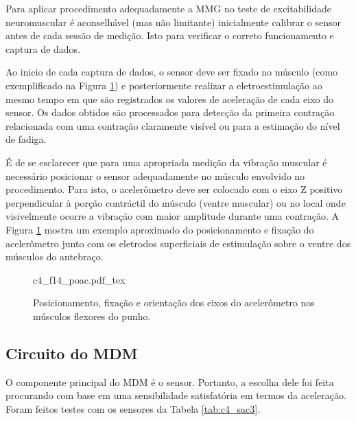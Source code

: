 Para aplicar procedimento adequadamente a \acrshort{MMG} no teste de excitabilidade neuromuscular é aconselhável (mas não limitante) inicialmente calibrar o sensor antes de cada sessão de medição. Isto para verificar o correto funcionamento e captura de dados.

Ao inicio de cada captura de dados, o sensor deve ser fixado no músculo (como exemplificado na Figura \ref{fig:c4_f14_poac}) e posteriormente realizar a eletroestimulação ao mesmo tempo em que são registrados os valores de aceleração de cada eixo do sensor. Os dados obtidos são processados para detecção da primeira contração relacionada com uma contração claramente visível ou para a estimação do nível de fadiga.

É de se esclarecer que para uma apropriada medição da vibração muscular é necessário posicionar o sensor adequadamente no músculo envolvido no procedimento. Para isto, o acelerômetro deve ser colocado com o eixo Z positivo perpendicular à porção contráctil do músculo (ventre muscular) ou no local onde visivelmente ocorre a vibração com maior amplitude durante uma contração. A Figura \ref{fig:c4_f14_poac} mostra um exemplo aproximado do posicionamento e fixação do acelerômetro junto com os eletrodos superficiais de estimulação sobre o ventre dos músculos do antebraço.

\begin{figure}
    \centering %
    \normalsize %
    \def\svgwidth{1.1\columnwidth}%
    {c4_f14_poac.pdf_tex}
    \caption{Posicionamento, fixação e orientação dos eixos do acelerômetro nos músculos flexores do punho.}
    \label{fig:c4_f14_poac}
\end{figure}

\newpage


\subsection*{Circuito do \acrshort{MDM}}

O componente principal do \acrshort{MDM} é o sensor. Portanto, a escolha dele foi feita procurando com base em uma sensibilidade satisfatória em termos da aceleração. Foram feitos testes com os sensores da Tabela \ref{tab:c4_sac3}. 


